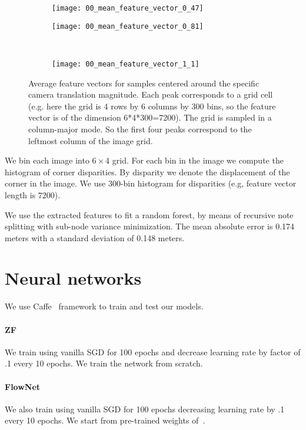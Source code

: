 \begin{figure}[!ht]
  \centering
  \begin{subfigure}{.45\linewidth}
    \centering
    \texttt{[image: 00\_mean\_feature\_vector\_0\_47]}
    \caption{}\label{fig:1a}
  \end{subfigure}%
  \begin{subfigure}{.45\linewidth}
    \centering
    \texttt{[image: 00\_mean\_feature\_vector\_0\_81]}
    \caption{}\label{fig:1b}
  \end{subfigure}%
  \\
  \begin{subfigure}{\linewidth}
    \centering
    \texttt{[image: 00\_mean\_feature\_vector\_1\_1]}
    \caption{}\label{fig:1c}
  \end{subfigure}%
  \caption{Average feature vectors for samples centered around the
    specific camera translation magnitude.  Each peak corresponds to a
    grid cell (e.g. here the grid is 4 rows by 6 columns by 300 bins,
    so the feature vector is of the dimension 6*4*300=7200).  The grid
    is sampled in a column-major mode. So the first four peaks
    correspond to the leftmost column of the image grid.}
  \label{fig:feature_vectors}
\end{figure}

We bin each image into $6\times 4$ grid.  For each bin in the image we
compute the histogram of corner disparities.  By disparity we denote
the displacement of the corner in the image.  We use $300$-bin
histogram for disparities (e.g, feature vector length is $7200$).

We use the extracted features to fit a random forest, by means of
recursive note splitting with sub-node variance minimization. The mean
absolute error is 0.174 meters with a standard deviation of 0.148
meters.

\section{Neural networks}

We use Caffe~\cite{jia2014caffe} framework to train and test our
models.
\paragraph{ZF} We train using vanilla SGD for 100 epochs and decrease
learning rate by factor of .1 every 10 epochs. We train the network
from scratch.
\paragraph{FlowNet} We also train using vanilla SGD for 100 epochs
decreasing learning rate by .1 every 10 epochs.  We start from
pre-trained weights of~\cite{fischer2015flownet}.
